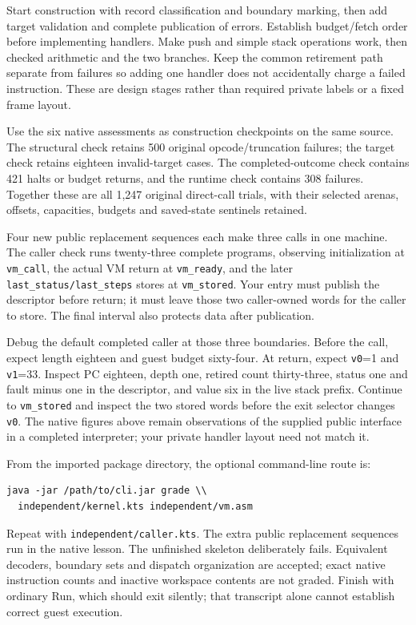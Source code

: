 Start construction with record classification and boundary marking, then add
target validation and complete publication of errors. Establish budget/fetch
order before implementing handlers. Make push and simple stack operations work,
then checked arithmetic and the two branches. Keep the common retirement path
separate from failures so adding one handler does not accidentally charge a
failed instruction. These are design stages rather than required private labels
or a fixed frame layout.

Use the six native assessments as construction checkpoints on the same source.
The structural check retains 500 original opcode/truncation failures; the target
check retains eighteen invalid-target cases. The completed-outcome check contains
421 halts or budget returns, and the runtime check contains 308 failures. Together
these are all 1,247 original direct-call trials, with their selected arenas,
offsets, capacities, budgets and saved-state sentinels retained.

Four new public replacement sequences each make three calls in one machine.
The caller check runs twenty-three complete programs, observing initialization
at \texttt{vm\_call}, the actual VM return at \texttt{vm\_ready}, and the later
\texttt{last\_status/last\_steps} stores at \texttt{vm\_stored}. Your entry must
publish the descriptor before return; it must leave those two caller-owned words
for the caller to store. The final interval also protects data after publication.

Debug the default completed caller at those three boundaries. Before the call,
expect length eighteen and guest budget sixty-four. At return, expect
\texttt{v0}=1 and \texttt{v1}=33. Inspect PC eighteen, depth one, retired count
thirty-three, status one and fault minus one in the descriptor, and value six in
the live stack prefix. Continue to \texttt{vm\_stored} and inspect the two stored
words before the exit selector changes \texttt{v0}. The native figures above
remain observations of the supplied public interface in a completed interpreter;
your private handler layout need not match it.

From the imported package directory, the optional command-line route is:
\begin{verbatim}
java -jar /path/to/cli.jar grade \\
  independent/kernel.kts independent/vm.asm
\end{verbatim}
Repeat with \texttt{independent/caller.kts}. The extra public replacement sequences
run in the native lesson. The unfinished skeleton deliberately fails. Equivalent
decoders, boundary sets and dispatch organization are accepted; exact native
instruction counts and inactive workspace contents are not graded. Finish with
ordinary Run, which should exit silently; that transcript alone cannot establish
correct guest execution.

